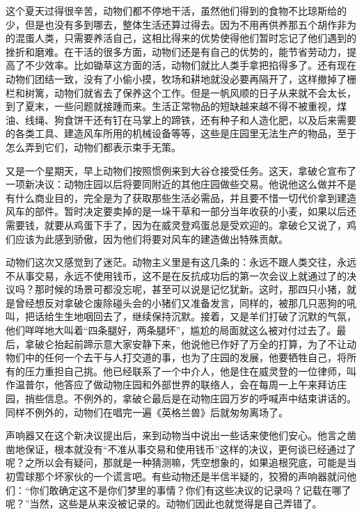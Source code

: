这个夏天过得很辛苦，动物们都不停地干活，虽然他们得到的食物不比琼斯给的少，但是也没有多到哪去，整体生活还算过得去。因为不用再供养那五个胡作非为的混蛋人类，只需要养活自己，这相比得来的优势使得他们暂时忘记了他们遇到的挫折和磨难。在干活的很多方面，动物们还是有自己的优势的，能节省劳动力，提高了不少效率。比如锄草这方面的活，动物们就比人类手拿把掐得多了。还有现在动物们团结一致，没有了小偷小摸，牧场和耕地就没必要再隔开了，这样撤掉了栅栏和树篱，动物们就省去了保养这个工作。但是一帆风顺的日子从来就不会太长，到了夏末，一些问题就接踵而来。生活正常物品的短缺越来越不得不被重视，煤油、线绳、狗食饼干还有钉在马掌上的蹄铁，还有种子和人造化肥，以及后来需要的各类工具、建造风车所用的机械设备等等，这些是庄园里无法生产的物品，至于怎么弄到它们，动物们都表示束手无策。

又是一个星期天，早上动物们按照惯例来到大谷仓接受任务。这天，拿破仑宣布了一项新决议：动物庄园以后将要同附近的其他庄园做些交易。他说他这么做并不是有什么商业目的，完全是为了获取那些生活必需品，并且要不惜一切代价拿到建造风车的部件。暂时决定要卖掉的是一垛干草和一部分当年收获的小麦，如果以后还需要钱，就要从鸡蛋下手了，因为在威灵登鸡蛋总是受欢迎的。拿破仑又说了，鸡们应该为此感到骄傲，因为他们将要对风车的建造做出特殊贡献。

动物们这次又感觉到了迷茫。动物主义里是有这几条的：永远不跟人类交往，永远不从事交易，永远不使用钱币，这不是在反抗成功后的第一次会议上就通过了的决议吗？那时候的场景可都没忘呢，甚至可以说是记忆犹新。这时，那四只小猪，就是曾经想反对拿破仑废除碰头会的小猪们又准备发言，同样的，被那几只恶狗的吼叫，把话给生生地咽回去了，继续保持沉默。接着，又是羊们打破了沉默的气氛，他们咩咩地大叫着“四条腿好，两条腿坏”，尴尬的局面就这么被对付过去了。最后，拿破仑抬起前蹄示意大家安静下来，他说他已作好了万全的打算，为了不让动物们中的任何一个去干与人打交道的事，也为了庄园的发展，他要牺牲自己，将所有的压力重担自己挑。他已经联系了一个中介人，他是住在威灵登的一位律师，叫作温普尔，他答应了做动物庄园和外部世界的联络人，会在每周一上午来拜访庄园，捎些信息。不例外的，拿破仑最后是在动物庄园万岁的呼喊声中结束讲话的。同样不例外的，动物们在唱完一遍《英格兰兽》后就匆匆离场了。

声响器又在这个新决议提出后，来到动物当中说出一些话来使他们安心。他言之凿凿地保证，根本就没有“不准从事交易和使用钱币”这样的决议，更何谈已经通过了呢？之所以会有疑问，那就是一种猜测嘛，凭空想象的，如果追根究底，可能是当初雪球那个坏家伙的一个谎言吧。有些动物还是半信半疑的，狡猾的声响器就问他们：“你们敢确定这不是你们梦里的事情？你们有这些决议的记录吗？记载在哪了呢？”当然，这些是从来没被记录的。动物们因此也就觉得是自己弄错了。

